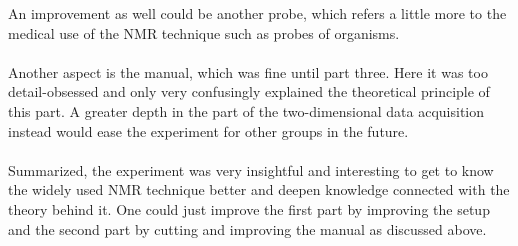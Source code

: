 An improvement as well could be another probe, which refers a little more to the medical use of the NMR technique such as probes of organisms.\\
\\
Another aspect is the manual, which was fine until part three. Here it was too detail-obsessed and only very confusingly explained the theoretical principle of this part. A greater depth in the part of the two-dimensional data acquisition instead would ease the experiment for other groups in the future.\\
\\
Summarized, the experiment was very insightful and interesting to get to know the widely used NMR technique better and deepen knowledge connected with the theory behind it. One could just improve the first part by improving the setup and the second part by cutting and improving the manual as discussed above.\\
